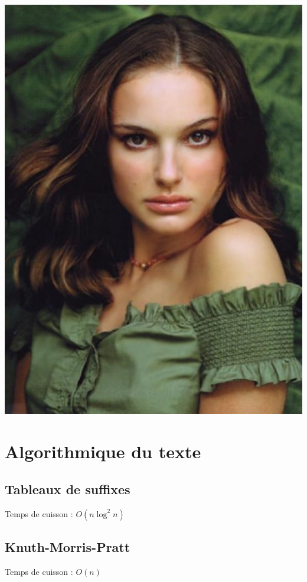 \documentclass[12pt]{article}
\begin{document}
\tableofcontents\vspace{0.5cm}
\begin{center}
\includegraphics[width=0.8\linewidth]{np.jpg}
\end{center}

\section{Algorithmique du texte}

\subsection{Tableaux de suffixes}
Temps de cuisson : $O(n \log^2 n)$
{\scriptsize}

\subsection{Knuth-Morris-Pratt}
Temps de cuisson : $O(n)$
{\scriptsize}
\end{document}
